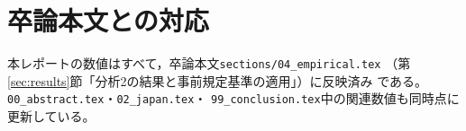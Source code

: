 \documentclass[dvipdfmx, a4paper, 11pt]{jsarticle}
\begin{document}
\section{卒論本文との対応}
本レポートの数値はすべて，卒論本文\texttt{sections/04\_empirical.tex}
（第\ref{sec:results}節「分析2の結果と事前規定基準の適用」）に反映済み
である。\texttt{00\_abstract.tex}・\texttt{02\_japan.tex}・
\texttt{99\_conclusion.tex}中の関連数値も同時点に更新している。
\end{document}
